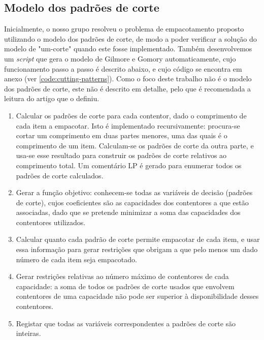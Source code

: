\documentclass[12pt, a4paper, titlepage]{article}
\begin{document}
\subsection{Modelo dos padrões de corte}

Inicialmente, o nosso grupo resolveu o problema de empacotamento proposto utilizando o modelo dos
padrões de corte, de modo a poder verificar a solução do modelo de "um-corte"{} quando este fosse
implementado. Também desenvolvemos um \emph{script} que gera o modelo de Gilmore e Gomory
automaticamente, cujo funcionamento passo a passo é descrito abaixo, e cujo código se encontra em
anexo (ver \ref{code:cutting-patterns}). Como o foco deste trabalho não é o modelo dos padrões de
corte, este não é descrito em detalhe, pelo que é recomendada a leitura do artigo que o definiu.
\cite{gilmore-and-gomory}

\begin{enumerate}
    \item Calcular os padrões de corte para cada contentor, dado o comprimento de cada item a
        empacotar. Isto é implementado recursivamente: procura-se cortar um comprimento em duas
        partes menores, uma das quais é o comprimento de um item. Calculam-se os padrões de corte da
        outra parte, e usa-se esse resultado para construir os padrões de corte relativos ao
        comprimento total. Um comentário LP é gerado para enumerar todos os padrões de corte
        calculados.

    \item Gerar a função objetivo: conhecem-se todas as variáveis de decisão (padrões de corte),
        cujos coeficientes são as capacidades dos contentores a que estão associadas, dado que se
        pretende minimizar a soma das capacidades dos contentores utilizados.

    \item Calcular quanto cada padrão de corte permite empacotar de cada item, e usar essa
        informação para gerar restrições que obrigam a que pelo menos um dado número de cada item
        seja empacotado.

    \item Gerar restrições relativas ao número máximo de contentores de cada capacidade: a soma de
        todos os padrões de corte usados que envolvem contentores de uma capacidade não pode ser
        superior à disponibilidade desses contentores.

    \item Registar que todas as variáveis correspondentes a padrões de corte são inteiras.
\end{enumerate}
\end{document}
